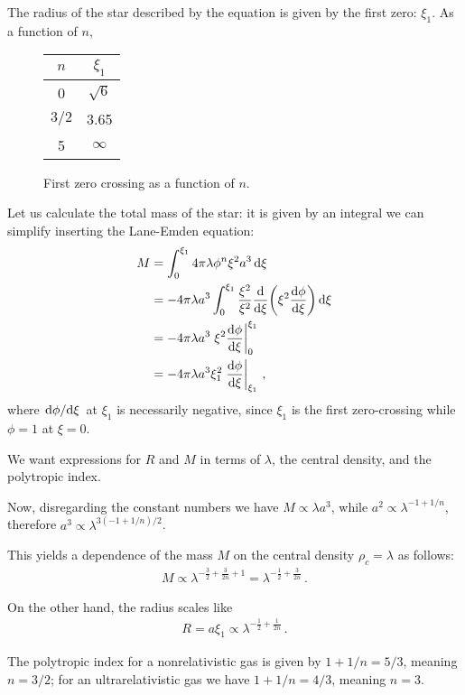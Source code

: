\documentclass[main.tex]{subfiles}
\begin{document}
The radius of the star described by the equation is given by the first zero: \(\xi_1 \). 
As a function of \(n\), 

\begin{figure}
\centering
\begin{tabular}{cc}
\(n\) & \(\xi_1\)\\
\hline
0 & \(\sqrt{6}\)  \\
\(3/2\) & \num{3.65}  \\
5 & \(\infty \)
\end{tabular}
\label{tab:zero-crossing-lane-emden}
\caption{First zero crossing as a function of \(n\).}
\end{figure}

Let us calculate the total mass of the star: it is given by an integral we can simplify inserting the Lane-Emden equation:
%
\begin{align}
M &= \int_{0}^{\xi_1 } 4 \pi \lambda \phi^{n} \xi^2 a^3 \dd{\xi }  \\
&= -4 \pi \lambda a^3 \int_{0}^{\xi_1 } \frac{\xi^2}{\xi^2} \dv{}{\xi } \qty( \xi^2 \dv{\phi }{\xi }) \dd{\xi }  \\
&= - 4 \pi \lambda a^3 \eval{\xi^2 \dv{\phi }{\xi }}_{0}^{\xi_1 }  \\
&= - 4 \pi \lambda a^3 \xi_1^2 \eval{\dv{\phi }{\xi }}_{\xi_1 }
\,,
\end{align}
%
where \(\dv*{\phi }{\xi}\) at \(\xi_1 \) is necessarily negative, since \(\xi_1\) is the first zero-crossing while \(\phi = 1\) at \(\xi= 0\). 

We want expressions for \(R\) and \(M\) in terms of \(\lambda \), the central density, and the polytropic index. 

Now, disregarding the constant numbers we have \(M \propto \lambda a^3\), while \(a^2 \propto \lambda^{-1 + 1/n}\), therefore \(a^3 \propto \lambda^{3 (-1 + 1/n) /2}\). 

This yields a dependence of the mass \(M\) on the central density \(\rho _c = \lambda \) as follows: 
%
\begin{align}
M \propto \lambda^{- \frac{3}{2} + \frac{3}{2n} + 1} = \lambda^{- \frac{1}{2} + \frac{3}{2n}}
\,.
\end{align}

On the other hand, the radius scales like 
%
\begin{align}
R = a \xi_1 \propto \lambda^{- \frac{1}{2} + \frac{1}{2n}}
\,.
\end{align}

The polytropic index for a nonrelativistic gas is given by \(1 + 1/n = 5/3\), meaning \(n = 3/2\); for an ultrarelativistic gas we have \(1 + 1/n = 4/3\), meaning \(n = 3\). 
\end{document}
